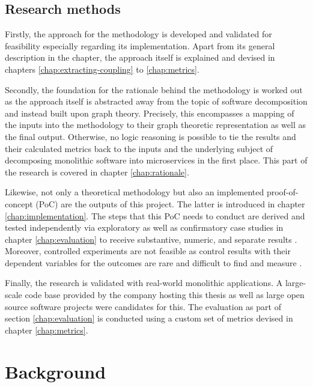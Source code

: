 \documentclass[12pt,a4paper]{report}
\begin{document}
\section{Research methods}

Firstly, the approach for the methodology is developed and validated for
feasibility especially regarding its implementation. Apart from its general
description in the \textit{} chapter, the approach itself
is explained and devised in chapters \ref{chap:extracting-coupling} to \ref{chap:metrics}.

Secondly, the foundation for the rationale behind the methodology is worked out
as the approach itself is abstracted away from the topic of software
decomposition and instead built upon graph theory. Precisely, this encompasses
a mapping of the inputs into the methodology to their graph theoretic
representation as well as the final output. Otherwise, no logic reasoning is
possible to tie the results and their calculated metrics back to the inputs and
the underlying subject of decomposing monolithic software into microservices in
the first place. This part of the research is covered in chapter \ref{chap:rationale}.

Likewise, not only a theoretical methodology but also an implemented proof-of-
concept (PoC) are the outputs of this project. The latter is introduced in
chapter \ref{chap:implementation}. The steps that this PoC needs to conduct are
derived and tested independently via exploratory as well as confirmatory case
studies in chapter \ref{chap:evaluation} to receive substantive, numeric, and
separate results \cite{easterbrook2008selecting}. Moreover, controlled
experiments are not feasible as control results with their dependent variables
for the outcomes are rare and difficult to find and measure
\cite{easterbrook2008selecting}.

Finally, the research is validated with real-world monolithic applications. A
large-scale code base provided by the company hosting this thesis as well as
large open source software projects were candidates for this. The evaluation as
part of section \ref{chap:evaluation} is conducted using a custom set of
metrics devised in chapter \ref{chap:metrics}.




\chapter{Background} \label{chap:background}
\end{document}
